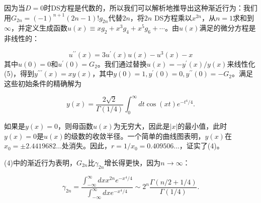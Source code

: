 \documentclass[UTF8]{article}
\begin{document}
因为当$D=0$时DS方程是代数的，所以我们可以解析地推导出这种渐近行为：我们用$G_{2 n}=(-1)^{n+1}(2 n-1) ! g_{2 n}$代替$2 n$，将$2 n$ DS方程乘以$x^{2 n}$，从$n=1$求和到$\infty$，并定义生成函数$u(x) \equiv x g_2+x^3 g_4+x^5 g_6+\cdots$。由$u(x)$满足的微分方程是非线性的：




$$u^{\prime \prime}(x)=3 u^{\prime}(x) u(x)-u^3(x)-x
$$其中$u(0)=0$和$u^{\prime}(0)=G_2$。我们通过替换$u(x)=-y^{\prime}(x) / y(x)$来线性化(5)，得到$y^{\prime \prime \prime}(x)=x y(x)$，其中$y(0)=1, y^{\prime}(0)=0, y^{\prime \prime}(0)=-G_2$。满足这些初始条件的精确解为




$$y(x)=\frac{2 \sqrt{2}}{\Gamma(1 / 4)} \int_0^{\infty} d t \cos (x t) e^{-t^4 / 4} .
$$


如果是$y(x)=0$，则母函数$u(x)$为无穷大，因此是$|x|$的最小值，此时$y(x)=0$是$u(x)$的级数的收敛半径。一个简单的曲线图表明，$y(x)$在$x_0= \pm 2.4419682 \ldots$处消失。因此，$r=1 / x_0=0.409506 \ldots$，证实了(4)。



(4)中的渐近行为表明，$G_{2 n}$比$\gamma_{2 n}$增长得更快，因为$n \rightarrow \infty$：


$$
\gamma_{2 n}=\frac{\int_{-\infty}^{\infty} d x x^{2 n} e^{-x^4 / 4}}{\int_{-\infty}^{\infty} d x e^{-x^4 / 4}} \sim 2^n \frac{\Gamma(n / 2+1 / 4)}{\Gamma(1 / 4)} .
$$
\end{document}
